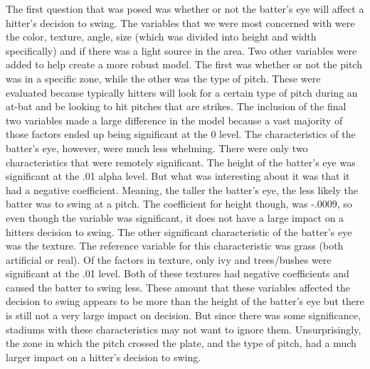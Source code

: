\documentclass{article}
\begin{document}
\begin{doublespace}
The first question that was posed was whether or not the batter's eye will affect a hitter's decision to swing. The variables that we were most concerned with were the color, texture, angle, size (which was divided into height and width specifically) and if there was a light source in the area. Two other variables were added to help create a more robust model. The first was whether or not the pitch was in a specific zone, while the other was the type of pitch. These were evaluated because typically hitters will look for a certain type of pitch during an at-bat and be looking to hit pitches that are strikes. The inclusion of the final two variables made a large difference in the model because a vast majority of those factors ended up being significant at the 0 level. The characteristics of the batter's eye, however, were much less whelming. There were only two characteristics that were remotely significant. The height of the batter's eye was significant at the .01 alpha level. But what was interesting about it was that it had a negative coefficient. Meaning, the taller the batter's eye, the less likely the batter was to swing at a pitch. The coefficient for height though, was -.0009, so even though the variable was significant, it does not have a large impact on a hitters decision to swing. The other significant characteristic of the batter's eye was the texture. The reference variable for this characteristic was grass (both artificial or real). Of the factors in texture, only ivy and trees/bushes were significant at the .01 level. Both of these textures had negative coefficients and caused the batter to swing less. These amount that these variables affected the decision to swing appears to be more than the height of the batter's eye but there is still not a very large impact on decision. But since there was some significance, stadiums with these characteristics may not want to ignore them. Unsurprisingly, the zone in which the pitch crossed the plate, and the type of pitch, had a much larger impact on a hitter's decision to swing. \\


\end{doublespace}
\end{document}

